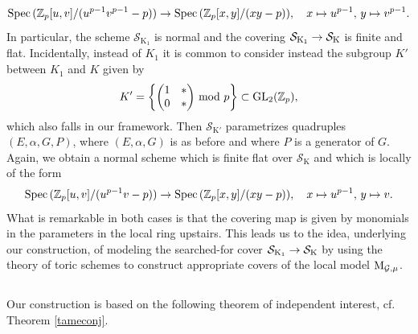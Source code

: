 \documentclass[reqno, 10pt]{amsart}
\makeatletter
\newcommand{\BZ}{\ensuremath{\mathbb {Z}}\xspace}
\newcommand{\CG}{\ensuremath{\mathcal {G}}\xspace}
\newcommand{\CS}{\ensuremath{\mathcal {S}}\xspace}
\newcommand{\RK}{\ensuremath{\mathrm {K}}\xspace}
\newcommand{\GL}{\mathrm{GL}}
\DeclareMathOperator{\Spec}{Spec\,}
\theoremstyle{definition}
\numberwithin{equation}{subsection}
\numberwithin{subsubsection}{subsection}
\renewcommand{\to}{%
   \ifbool{@display}{\longrightarrow}{\rightarrow}%
   }
\let\shortmapsto\mapsto
\renewcommand{\mapsto}{%
   \ifbool{@display}{\shortmapsto}{\shortmapsto}%
   }
\newcommand{\Mloc}{{\rm M}}
\makeatother
\begin{document}
\[
\Spec(\BZ_p[u, v]/(u^{p-1}v^{p-1}-p))\to \Spec(\BZ_p[x, y]/(xy-p)), \quad x\mapsto u^{p-1},\, y\mapsto v^{p-1} .
\]
In particular, the scheme $\CS_{\RK_1}$ is normal and the covering $\CS_{\RK_1}\to \CS_\RK$ is finite and flat. Incidentally, instead of $K_1$ it is common to consider instead the subgroup $K'$ between $K_1$ and $K$ given by 
\[
K'=\left\{\begin{pmatrix}1 &*\\ 0& *\end{pmatrix}\,{\rm mod}\ p  \right\}\subset \GL_2(\BZ_p),
\]
which also falls in our framework. Then $\CS_{\RK'}$ parametrizes quadruples $(E, \alpha, G, P)$, where $(E, \alpha, G)$ is as before and where $P$ is a generator of $G$. Again, we obtain a normal scheme which is finite flat over $\CS_\RK$ and which is locally of the form
\[
\Spec(\BZ_p[u, v]/(u^{p-1}v-p))\to \Spec(\BZ_p[x, y]/(xy-p)), \quad x\mapsto u^{p-1},\, y\mapsto v .
\]
What is remarkable in both cases is that the covering map is given by monomials in the parameters in the local ring upstairs. This leads us to the idea, underlying our construction, of modeling the searched-for cover $\CS_{\RK_1}\to \CS_\RK$ by using the theory of toric schemes to construct appropriate covers of the local model $\Mloc_{\CG,\mu}$. 

\subsection{} Our construction is based on the following theorem of independent interest, cf. Theorem \ref{tameconj}.
\end{document}
